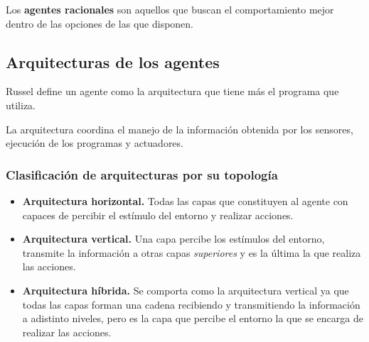 \documentclass[a4paper]{article}
\begin{document}
 Los \textbf{agentes racionales} son aquellos que buscan el comportamiento mejor dentro de las opciones de las que
 disponen. 

 \subsection{Arquitecturas de los agentes}  
Russel define un agente como la arquitectura que tiene más el programa que utiliza. 

La arquitectura coordina el manejo de la información obtenida por los sensores, ejecución de los programas y actuadores. 

\subsubsection*{Clasificación de arquitecturas por su topología}

\begin{itemize}
  \item \textbf{ Arquitectura horizontal.} Todas las capas que constituyen al agente con capaces
  de percibir el estímulo del entorno y realizar acciones. 

  \item \textbf{Arquitectura vertical.} Una capa percibe los estímulos del entorno, transmite la información a otras capas \textit{superiores}
  y es la última la que realiza las acciones. 

\item \textbf{Arquitectura híbrida.} Se comporta como la arquitectura vertical ya que todas las capas forman una cadena
recibiendo y transmitiendo la información a adistinto niveles, 
pero es la capa que percibe el entorno la que se encarga de realizar las acciones.

\end{itemize}
\end{document}
